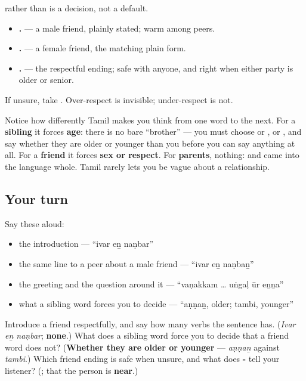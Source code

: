 \begin{culture}
\textbf{} rather than \textbf{} is a decision, not a default.

\begin{itemize}
\raggedright
  \item \textbf{  .} — a male friend, plainly stated; warm among peers.
  \item \textbf{  .} — a female friend, the matching plain form.
  \item \textbf{  .} — the respectful ending; safe with anyone, and right when either party is older or senior.
\end{itemize}

If unsure, take \textbf{}. Over-respect is invisible; under-respect is not.

Notice how differently Tamil makes you think from one word to the next. For a \textbf{sibling} it forces \textbf{age}: there is no bare \textquotedblleft{}brother\textquotedblright{} — you must choose \textbf{} or \textbf{}, \textbf{} or \textbf{}, and say whether they are older or younger than you before you can say anything at all. For a \textbf{friend} it forces \textbf{sex or respect}. For \textbf{parents}, nothing: \textbf{} and \textbf{} came into the language whole. Tamil rarely lets you be vague about a relationship.
\end{culture}

\subsection*{Your turn}
Say these aloud:

\begin{itemize}
\raggedright
  \item the introduction — \textquotedblleft{}ivar eṉ naṇbar\textquotedblright{}
  \item the same line to a peer about a male friend — \textquotedblleft{}ivar eṉ naṇbaṉ\textquotedblright{}
  \item the greeting and the question around it — \textquotedblleft{}vaṇakkam … uṅgaḷ ūr eṉṉa\textquotedblright{}
  \item what a sibling word forces you to decide — \textquotedblleft{}aṇṇaṉ, older; tambi, younger\textquotedblright{}
\end{itemize}

\begin{tcolorbox}[breakable,colback=teal!4,colframe=teal!35!black,title={Before you move on}]
Introduce a friend respectfully, and say how many verbs the sentence has. (\emph{Ivar eṉ naṇbar}; \textbf{none}.) What does a sibling word force you to decide that a friend word does not? (\textbf{Whether they are older or younger} — \emph{aṇṇaṉ} against \emph{tambi}.) Which friend ending is safe when unsure, and what does \textbf{-} tell your listener? (\textbf{}; that the person is \textbf{near}.)
\end{tcolorbox}
